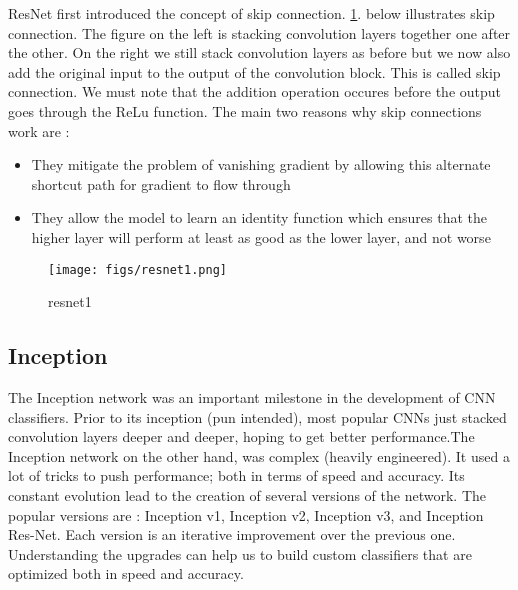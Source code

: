 ResNet first introduced the concept of skip connection. \cref{fig:resnet1}. below illustrates skip connection. The figure on the left is stacking convolution layers together one after the other. On the right we still stack convolution layers as before but we now also add the original input to the output of the convolution block. This is called skip connection. We must note that the addition operation occures before the output goes through the ReLu function.
The main two reasons why skip connections work are :

\begin{itemize}
  \item They mitigate the problem of vanishing gradient by allowing this alternate shortcut path for gradient to flow through
  \item They allow the model to learn an identity function which ensures that the higher layer will perform at least as good as the lower layer, and not worse
\end{itemize}

\begin{figure}[!htpb]
	\centering
	\texttt{[image: figs/resnet1.png]}
	\caption{resnet1}\label{fig:resnet1}
\end{figure}

\subsection{Inception}

The Inception network was an important milestone in the development of CNN classifiers. Prior to its inception (pun intended), most popular CNNs just stacked convolution layers deeper and deeper, hoping to get better performance.The Inception network on the other hand, was complex (heavily engineered). It used a lot of tricks to push performance; both in terms of speed and accuracy. Its constant evolution lead to the creation of several versions of the network. The popular versions are : Inception v1, Inception v2, Inception v3, and Inception Res-Net. Each version is an iterative improvement over the previous one. Understanding the upgrades can help us to build custom classifiers that are optimized both in speed and accuracy.

